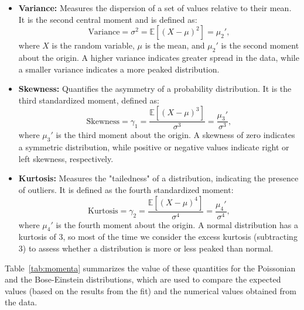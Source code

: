 \documentclass[prl,twocolumn]{revtex4-1}
\begin{document}
\begin{itemize}
    \item \textbf{Variance:} 
    Measures the dispersion of a set of values relative to their mean. It is the second central moment and is defined as:
    \begin{equation}
        \text{Variance} = \sigma^2 = \mathbb{E}[(X - \mu)^2] = \mu_2',
    \end{equation}
    where \(X\) is the random variable, \(\mu\) is the mean, and \(\mu_2'\) is the second moment about the origin. A higher variance indicates greater spread in the data, while a smaller variance indicates a more peaked distribution.

    \item \textbf{Skewness:} 
    Quantifies the asymmetry of a probability distribution. It is the third standardized moment, defined as:
    \begin{equation}
        \text{Skewness} = \gamma_1 = \frac{\mathbb{E}[(X - \mu)^3]}{\sigma^3} = \frac{\mu_3'}{\sigma^3},
    \end{equation}
    where \(\mu_3'\) is the third moment about the origin. A skewness of zero indicates a symmetric distribution, while positive or negative values indicate right or left skewness, respectively.

    \item \textbf{Kurtosis:} 
    Measures the "tailedness" of a distribution, indicating the presence of outliers. It is defined as the fourth standardized moment:
    \begin{equation}
        \text{Kurtosis} = \gamma_2 = \frac{\mathbb{E}[(X - \mu)^4]}{\sigma^4} = \frac{\mu_4'}{\sigma^4},
    \end{equation}
    where \(\mu_4'\) is the fourth moment about the origin. A normal distribution has a kurtosis of 3, so most of the time we consider the excess kurtosis (subtracting 3) to assess whether a distribution is more or less peaked than normal.

\end{itemize}

Table~\ref{tab:momenta} summarizes the value of these quantities for the Poissonian and the Bose-Einstein distributions, which are used to compare the expected values (based on the results from the fit) and the numerical values obtained from the data.
\end{document}

